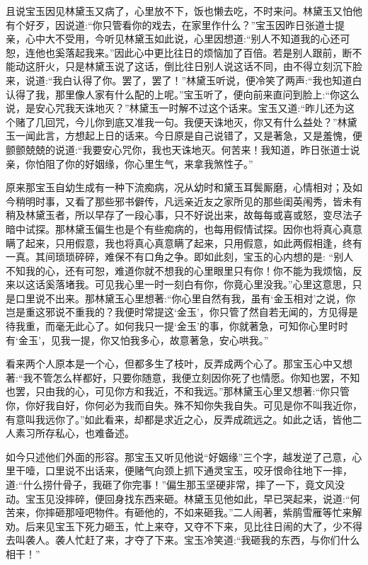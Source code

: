 \begin{parag}
    且说宝玉因见林黛玉又病了，心里放不下，饭也懒去吃，不时来问。林黛玉又怕他有个好歹，因说道:“你只管看你的戏去，在家里作什么？”宝玉因昨日张道士提亲，心中大不受用，今听见林黛玉如此说，心里因想道:“别人不知道我的心还可恕，连他也奚落起我来。”因此心中更比往日的烦恼加了百倍。若是别人跟前，断不能动这肝火，只是林黛玉说了这话，倒比往日别人说这话不同，由不得立刻沉下脸来，说道:“我白认得了你。罢了，罢了！”林黛玉听说，便冷笑了两声:“我也知道白认得了我，那里像人家有什么配的上呢。”宝玉听了，便向前来直问到脸上:“你这么说，是安心咒我天诛地灭？”林黛玉一时解不过这个话来。宝玉又道:“昨儿还为这个赌了几回咒，今儿你到底又准我一句。我便天诛地灭，你又有什么益处？”林黛玉一闻此言，方想起上日的话来。今日原是自己说错了，又是著急，又是羞愧，便颤颤兢兢的说道:“我要安心咒你，我也天诛地灭。何苦来！我知道，昨日张道士说亲，你怕阻了你的好姻缘，你心里生气，来拿我煞性子。”
\end{parag}


\begin{parag}
    原来那宝玉自幼生成有一种下流痴病，况从幼时和黛玉耳鬓厮磨，心情相对；及如今稍明时事，又看了那些邪书僻传，凡远亲近友之家所见的那些闺英闱秀，皆未有稍及林黛玉者，所以早存了一段心事，只不好说出来，故每每或喜或怒，变尽法子暗中试探。那林黛玉偏生也是个有些痴病的，也每用假情试探。因你也将真心真意瞒了起来，只用假意，我也将真心真意瞒了起来，只用假意，如此两假相逢，终有一真。其间琐琐碎碎，难保不有口角之争。即如此刻，宝玉的心内想的是: “别人不知我的心，还有可恕，难道你就不想我的心里眼里只有你！你不能为我烦恼，反来以这话奚落堵我。可见我心里一时一刻白有你，你竟心里没我。”心里这意思，只是口里说不出来。那林黛玉心里想著:“你心里自然有我，虽有‘金玉相对’之说，你岂是重这邪说不重我的？我便时常提这‘金玉’，你只管了然自若无闻的，方见得是待我重，而毫无此心了。如何我只一提‘金玉’的事，你就著急，可知你心里时时有‘金玉’，见我一提，你又怕我多心，故意著急，安心哄我。”
\end{parag}


\begin{parag}
    看来两个人原本是一个心，但都多生了枝叶，反弄成两个心了。那宝玉心中又想著:“我不管怎么样都好，只要你随意，我便立刻因你死了也情愿。你知也罢，不知也罢，只由我的心，可见你方和我近，不和我远。”那林黛玉心里又想著:“你只管你，你好我自好，你何必为我而自失。殊不知你失我自失。可见是你不叫我近你，有意叫我远你了。”如此看来，却都是求近之心，反弄成疏远之。如此之话，皆他二人素习所存私心，也难备述。
\end{parag}


\begin{parag}
    如今只述他们外面的形容。那宝玉又听见他说“好姻缘”三个字，越发逆了己意，心里干噎，口里说不出话来，便赌气向颈上抓下通灵宝玉，咬牙恨命往地下一摔，道:“什么捞什骨子，我砸了你完事！”偏生那玉坚硬非常，摔了一下，竟文风没动。宝玉见没摔碎，便回身找东西来砸。林黛玉见他如此，早已哭起来，说道:“何苦来，你摔砸那哑吧物件。有砸他的，不如来砸我。”二人闹著，紫鹃雪雁等忙来解劝。后来见宝玉下死力砸玉，忙上来夺，又夺不下来，见比往日闹的大了，少不得去叫袭人。袭人忙赶了来，才夺了下来。宝玉冷笑道:“我砸我的东西，与你们什么相干！”
\end{parag}


